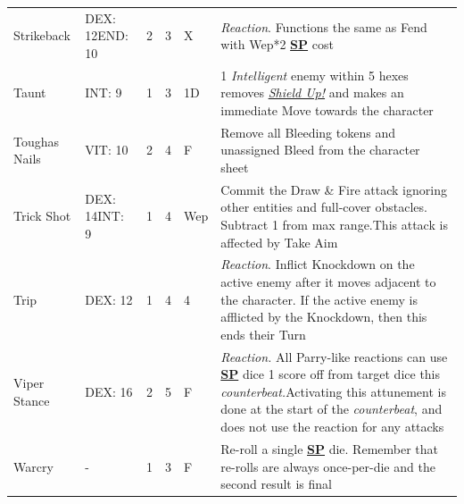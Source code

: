 \documentclass[12pt]{article}
\newcommand{\refto}[1]{\hyperlink{#1}{\textbf{#1}}}
\newcommand{\reftoit}[1]{\hyperlink{#1}{\emph{#1}}}
\begin{document}
\begin{center}
\begin{tabularx}{\textwidth}{p{}p{}p{}p{}p{}p{}}
Strikeback & DEX: 12\newline END: 10 & 2 & 3 & X & \emph{Reaction}. Functions the same as Fend with Wep*2 \refto{SP} cost\\
Taunt & INT: 9 & 1 & 3 & 1D & 1 \emph{Intelligent} enemy within 5 hexes removes \reftoit{Shield Up!} and makes an immediate Move towards the character \\
Tough\newline as Nails & VIT: 10 & 2 & 4 & F & Remove all Bleeding tokens and unassigned Bleed from the character sheet\\
Trick Shot & DEX: 14\newline INT: 9 & 1 & 4 & Wep & Commit the Draw \& Fire attack ignoring other entities and full-cover obstacles. Subtract 1 from max range.\newline This attack is affected by Take Aim\\
Trip & DEX: 12 & 1 & 4 & 4 & \emph{Reaction}. Inflict Knockdown on the active enemy after it moves adjacent to the character. If the active enemy is afflicted by the Knockdown, then this ends their Turn\\
Viper Stance & DEX: 16 & 2 & 5 & F & \emph{Reaction.} All Parry-like reactions can use \refto{SP} dice 1 score off from target dice this \emph{counterbeat.}\newline Activating this attunement is done at the start of the \emph{counterbeat}, and does not use the reaction for any attacks\\
Warcry & - & 1 & 3 & F & Re-roll a single \refto{SP} die. Remember that re-rolls are always once-per-die and the second result is final\\
\hline
\end{tabularx}
\end{center}

\pagebreak
\end{document}

